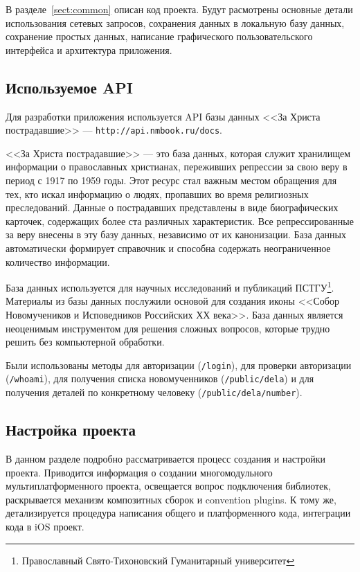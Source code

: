 \documentclass[14pt, russian]{scrartcl}
\begin{document}
В разделе~\ref{sect:common} описан код проекта. Будут расмотрены основные детали использования сетевых запросов, сохранения данных в локальную базу данных, сохранение простых данных, написание графического пользовательского интерфейса и архитектура приложения.

\subsection{Используемое API}\label{sect:api}

Для разработки приложения используется API базы данных <<За Христа пострадавшие>> --- \texttt{http://api.nmbook.ru/docs}.

<<За Христа пострадавшие>> --- это база данных, которая служит хранилищем информации о православных христианах, переживших репрессии за свою веру в период с 1917 по 1959 годы. Этот ресурс стал важным местом обращения для тех, кто искал информацию о людях, пропавших во время религиозных преследований. Данные о пострадавших представлены в виде биографических карточек, содержащих более ста различных характеристик. Все репрессированные за веру внесены в эту базу данных, независимо от их канонизации. База данных автоматически формирует справочник и способна содержать неограниченное количество информации.

База данных используется для научных исследований и публикаций \mbox{ПСТГУ}\footnote{Православный Свято-Тихоновский Гуманитарный университет}. Материалы из базы данных послужили основой для создания иконы <<Собор Новомучеников и Исповедников Российских ХХ века>>. База данных является неоценимым инструментом для решения сложных вопросов, которые трудно решить без компьютерной обработки.

Были использованы методы для авторизации (\texttt{/login}), для проверки авторизации (\texttt{/whoami}), для получения списка новомученников (\texttt{/public/dela}) и для получения деталей по конкретному человеку (\texttt{/public/dela/{number}}).

\subsection{Настройка проекта}\label{sect:setup}

В данном разделе подробно рассматривается процесс создания и настройки проекта. Приводится информация о создании многомодульного мультиплатформенного проекта, освещается вопрос подключения библиотек, раскрывается механизм композитных сборок и convention plugins. К тому же, детализируется процедура написания общего и платформенного кода, интеграции кода в iOS проект.
\end{document}
